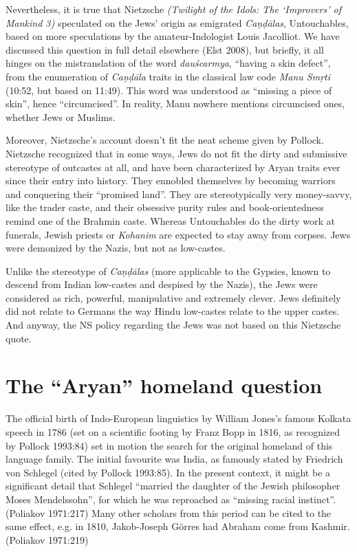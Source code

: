 Nevertheless, it is true that Nietzsche {\sl (Twilight of the Idols: The ‘Improvers’ of Mankind 3)} speculated on the Jews’ origin as emigrated {\sl Caṇḍālas}, Untouchables, based on more speculations by the amateur-Indologist Louis Jacolliot. We have discussed this question in full detail elsewhere (Elst 2008), but briefly, it all hinges on the mistranslation of the word {\sl dauścarmya}, “having a skin defect”, from the enumeration of {\sl Caṇḍāla} traits in the classical law code {\sl Manu Smṛti} (10:52, but based on 11:49). This word was understood as “missing a piece of skin”, hence “circumcised”. In reality, Manu nowhere mentions circumcised ones, whether Jews or Muslims.

Moreover, Nietzsche’s account doesn’t fit the neat scheme given by Pollock. Nietzsche recognized that in some ways, Jews do not fit the dirty and submissive stereotype of outcastes at all, and have been characterized by Aryan traits ever since their entry into history. They ennobled themselves by becoming warriors and conquering their “promised land”. They are stereotypically very money-savvy, like the trader caste, and their obsessive purity rules and book-orientedness remind one of the Brahmin caste. Whereas Untouchables do the dirty work at funerals, Jewish priests or {\sl Kohanim} are expected to stay away from corpses. Jews were demonized by the Nazis, but not as low-castes.

Unlike the stereotype of {\sl Caṇḍālas} (more applicable to the Gypsies, known to descend from Indian low-castes and despised by the Nazis), the Jews were considered as rich, powerful, manipulative and extremely clever. Jews definitely did not relate to Germans the way Hindu low-castes relate to the upper castes. And anyway, the NS policy regarding the Jews was not based on this Nietzsche quote.

\section*{The “Aryan” homeland question}

The official birth of Indo-European linguistics by William Jones’s famous Kolkata speech in 1786 (set on a scientific footing by Franz Bopp in 1816, as recognized by Pollock 1993:84) set in motion the search for the original homeland of this language family. The initial favourite was India, as famously stated by Friedrich von Schlegel (cited by Pollock 1993:85). In the present context, it might be a significant detail that Schlegel “married the daughter of the Jewish philosopher Moses Mendelssohn”, for which he was reproached as “missing racial instinct”. (Poliakov 1971:217) Many other scholars from this period can be cited to the same effect, e.g. in 1810, Jakob-Joseph Görres had Abraham come from Kashmir. (Poliakov 1971:219)


